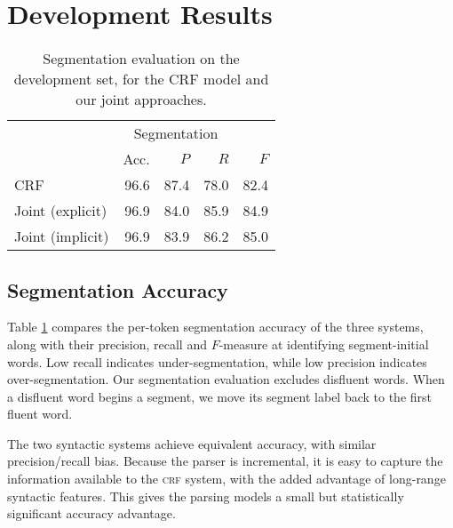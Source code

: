 \documentclass[11pt,letterpaper]{article}
\begin{document}
\section{Development Results}

\label{sec:results}

\begin{table}
    \centering
    \small
    \begin{tabular}{l|rrrr}
        \hline
               & \multicolumn{3}{c}{Segmentation} \\
               & Acc. & $P$ & $R$ & $F$ \\
        \hline
        CRF              & 96.6 & 87.4 & 78.0 & 82.4 \\
        Joint (explicit) & 96.9 & 84.0 & 85.9 & 84.9 \\
        Joint (implicit) & 96.9 & 83.9 & 86.2 & 85.0 \\
        \hline
    \end{tabular}
    \caption{\small Segmentation evaluation on the development set, for
    the CRF model and our joint approaches.\label{tab:sbd_eval}}
    \vspace*{-4em}
\end{table}

\subsection{Segmentation Accuracy}

Table \ref{tab:sbd_eval} compares the per-token segmentation accuracy of the
three systems, along with their precision, recall and $F$-measure at identifying
segment-initial words.  Low recall indicates under-segmentation, while low precision
indicates over-segmentation.  Our segmentation evaluation excludes disfluent words.
When a disfluent word begins a segment, we move its segment label back to the first
fluent word.


The two syntactic systems achieve equivalent accuracy, with similar precision/recall
bias.  Because the parser is incremental, it is easy to capture the information
available to the \textsc{crf} system, with the added advantage of long-range
syntactic features.  This gives the parsing models a small but statistically
significant accuracy advantage.
\end{document}

